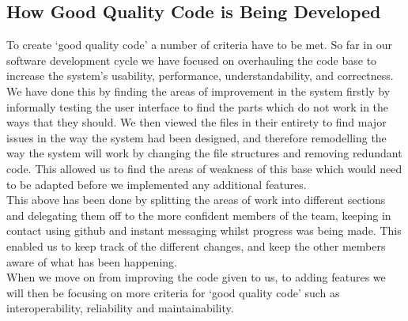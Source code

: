 \subsection*{How Good Quality Code is Being Developed}

To create ‘good quality code’ a number of criteria have to be met. So far in our software development cycle we have focused on overhauling the code base to increase the system's usability, performance, understandability, and correctness.\\

We have done this by finding the areas of improvement in the system firstly by informally testing the user interface to find the parts which do not work in the ways that they should. We then viewed the files in their entirety to find major issues in the way the system had been designed, and therefore remodelling the way the system will work by changing the file structures and removing redundant code. This allowed us to find the areas of weakness of this base which would need to be adapted before we implemented any additional features.\\

This above has been done by splitting the areas of work into different sections and delegating them off to the more confident members of the team, keeping in contact using github and instant messaging whilst progress was being made. This enabled us to keep track of the different changes, and keep the other members aware of what has been happening.\\

When we move on from improving the code given to us, to adding features we will then be focusing on more criteria for ‘good quality code’ such as interoperability, reliability and maintainability.\\